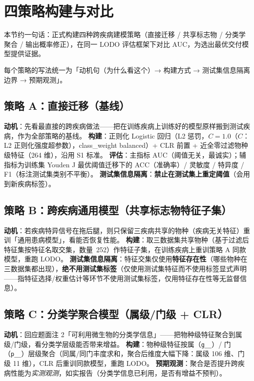 \documentclass{internal-report}
\begin{document}

\section{四策略构建与对比}

本节约一句话：正式构建四种跨疾病建模策略（直接迁移 / 共享标志物 / 分类学聚合 / 输出概率修正），在同一 LODO 评估框架下对比 AUC，为选出最优交付模型提供证据。

每个策略的写法统一为「动机句（为什么看这个）→ 构建方式 → 测试集信息隔离边界 → 预期观测」。

\subsection{策略 A：直接迁移（基线）}
\textbf{动机}：先看最直接的跨疾病做法——把在训练疾病上训练好的模型原样搬到测试疾病，作为全部策略的基线。
\textbf{构建}：正则化 Logistic 回归（L2 惩罚，$C=1.0$（$C$：L2 正则化强度超参数），class\_weight balanced）+ CLR 前置 + 近全零过滤物种级特征（264 维），沿用 S1 标准。
\textbf{评估}：主指标 AUC（阈值无关，最诚实）；辅指标为训练集 Youden J 最优阈值迁移下的 ACC（准确率）/ 灵敏度 / 特异度 / F1（标注测试集类别不平衡）\cite{youden1950}。
\textbf{测试集信息隔离}：\textbf{禁止在测试集上重定阈值}（会用到新疾病标签）。

\subsection{策略 B：跨疾病通用模型（共享标志物特征子集）}
\textbf{动机}：若疾病特异信号在拖后腿，则只保留三疾病共享的物种（疾病无关特征）重训「通用患病模型」，看能否恢复性能。
\textbf{构建}：取三数据集共享物种（基于过滤后特征集按特征名取交集，数量\ 252）作特征子集，在训练疾病上重训策略 A 同款模型，重跑 LODO。
\textbf{测试集信息隔离}：特征交集仅使用\textbf{特征存在性}（哪些物种在三数据集都出现），\textbf{绝不用测试集标签}（仅使用测试集特征而不使用标签显式声明——指特征选择/权重估计等环节不使用测试集标签，仅用特征存在性等无监督信息）。

\subsection{策略 C：分类学聚合模型（属级/门级 + CLR）}
\textbf{动机}：回应题面注 2「可利用微生物的分类学信息」——把物种级特征聚合到属级/门级，看分类学层级能否带来增益。
\textbf{构建}：物种级特征按属（\texttt{g\_\_}）/ 门（\texttt{p\_\_}）层级聚合（同属/同门丰度求和，聚合后维度大幅下降：属级 106 维、门级 11 维），CLR 后重训同款模型，重跑 LODO。
\textbf{预期观测}：聚合是否提升跨疾病性能为\emph{实测观测}，如实报告（分类学信息已利用，是否有增益不预判）。
\end{document}
